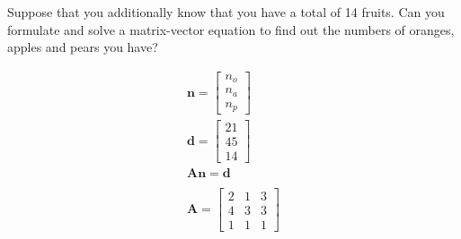 Suppose that you additionally know that you have a total of 14 fruits. Can you formulate and solve a matrix-vector equation to find out the numbers of oranges, apples and pears you have?

\begin{solution}
\begin{align*}
    \boldsymbol{n} = \begin{bmatrix}
        n_o \\ n_a \\ n_p
    \end{bmatrix} \\
    \boldsymbol{d} = \begin{bmatrix}
        21 \\ 45 \\ 14
    \end{bmatrix} \\
    \boldsymbol{An} = \boldsymbol{d} \\
    \ \\
    \boldsymbol{A} = \begin{bmatrix}
        2 & 1 & 3 \\
        4 & 3 & 3 \\
        1 & 1 & 1
    \end{bmatrix}
\end{align*}

\end{solution}
